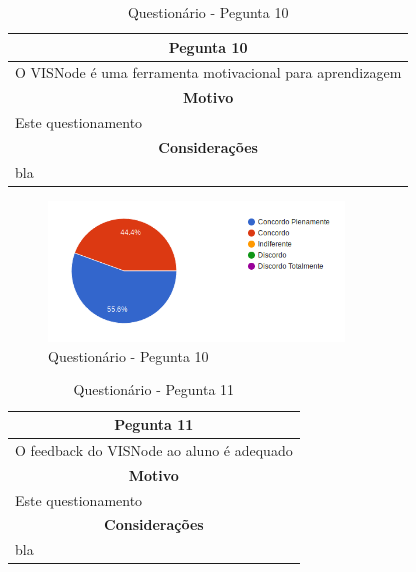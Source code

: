 \documentclass[
	12pt,				%
	oneside,			%
	a4paper,			%
	english,			%
	french,				%
	spanish,			%
	brazil,				%
	]{abntex2}
\begin{document}
\begin{table}[H]
\centering
\caption{Questionário - Pegunta 10} 
\def\arraystretch{1.5}
\begin{tabular}{l}
\hline
\multicolumn{1}{c}{\textbf{Pegunta 10}}              \\ \hline
O VISNode é uma ferramenta motivacional para aprendizagem \\ \hline
\multicolumn{1}{c}{\textbf{Motivo}}                 \\ \hline
Este questionamento                                   \\ \hline
\multicolumn{1}{c}{\textbf{Considerações}}          \\ \hline
bla                                                   \\ \hline
\end{tabular}
\sourceAuthor
\end{table}

\begin{figure}[H]
\centering
\caption{Questionário - Pegunta 10}
\includegraphics[width=0.7\textwidth]{imagens/v1/p10.png}
\sourceAuthor
\end{figure}

\begin{table}[H]
\centering
\caption{Questionário - Pegunta 11} 
\def\arraystretch{1.5}
\begin{tabular}{l}
\hline
\multicolumn{1}{c}{\textbf{Pegunta 11}}              \\ \hline
O feedback do VISNode ao aluno é adequado \\ \hline
\multicolumn{1}{c}{\textbf{Motivo}}                 \\ \hline
Este questionamento                                   \\ \hline
\multicolumn{1}{c}{\textbf{Considerações}}          \\ \hline
bla                                                   \\ \hline
\end{tabular}
\sourceAuthor
\end{table}
\end{document}
